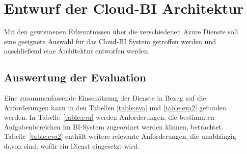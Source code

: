 \section{Entwurf der Cloud-BI Architektur} \label{sec:entwurfBIArchitektur}
Mit den gewonnenen Erkenntnissen über die verschiedenen Azure Dienste soll eine geeignete Auswahl für das Cloud-BI System getroffen werden und anschließend eine Architektur entworfen werden.

\subsection{Auswertung der Evaluation} \label{sec:konzeption:evaAuswertung}
 Eine zusammenfassende Einschätzung der Dienste in Bezug auf die Anforderungen kann in den Tabellen \ref{table:eva} und \ref{table:eva2} gefunden werden. In Tabelle~\ref{table:eva} werden Anforderungen, die bestimmten Aufgabenbereichen im BI-System zugeordnet werden können, betrachtet. Tabelle~\ref{table:eva2} enthält weitere relevante Anforderungen, die unabhängig davon sind, wofür ein Dienst eingesetzt wird.
 

